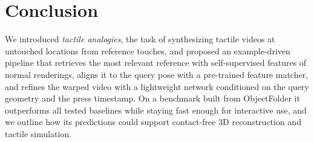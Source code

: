 \section{Conclusion}
\label{sec:conclusion}

We introduced \emph{tactile analogies}, the task of synthesizing tactile videos at untouched
locations from reference touches, and proposed an example-driven pipeline that retrieves the most
relevant reference with self-supervised features of normal renderings, aligns it to the query pose
with a pre-trained feature matcher, and refines the warped video with a lightweight network
conditioned on the query geometry and the press timestamp. On a benchmark built from ObjectFolder it
outperforms all tested baselines while staying fast enough for interactive use, and we outline how
its predictions could support contact-free 3D reconstruction and tactile simulation.
